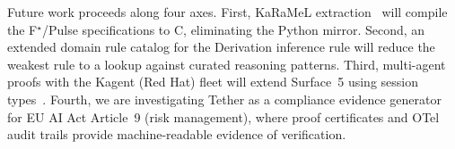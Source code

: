 \documentclass[sigplan,screen,nonacm]{acmart}
\newcommand{\fstar}{F\ensuremath{^\star}}
\begin{document}
Future work proceeds along four axes. First, KaRaMeL
extraction~\cite{protzenko2017verified} will compile the \fstar{}/Pulse
specifications to C, eliminating the Python mirror. Second, an extended
domain rule catalog for the Derivation inference rule will reduce the
weakest rule to a lookup against curated reasoning patterns. Third,
multi-agent proofs with the Kagent (Red Hat) fleet will extend Surface~5
using session types~\cite{gay2026session}. Fourth, we are investigating
Tether as a compliance evidence generator for EU AI Act Article~9 (risk
management), where proof certificates and OTel audit trails provide
machine-readable evidence of verification.




\end{document}
